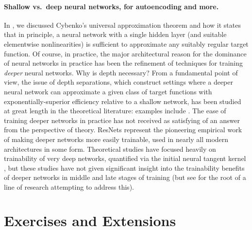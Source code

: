 \documentclass[../../book-main.tex]{subfiles}
\begin{document}
\paragraph{Shallow vs.\ deep neural networks, for autoencoding and more.}
In , we discussed Cybenko's universal approximation
theorem and how it states that in principle, a neural network with a single
hidden layer (and suitable elementwise nonlinearities) is sufficient to
approximate any suitably regular target function. Of course, in practice, the
major architectural reason for the dominance of neural networks in practice has
been the refinement of techniques for training \textit{deeper} neural networks.
Why is depth necessary?
From a fundamental point of view, the issue of depth separations, which
construct settings where a deeper neural network can approximate a given class
of target functions with exponentially-superior efficiency relative to a shallow
network,
has been studied at great length in the theoretical literature:
examples include \cite{Telgarsky2016-sn,Bresler2020-xy,Venturi2021-qc}. 
The ease of training deeper
networks in practice has not received as satisfying of an answer from the
perspective of theory. 
ResNets \cite{he2016deep} represent the pioneering empirical work of
making deeper networks more easily trainable, used in nearly all modern
architectures in some form. Theoretical studies have focused heavily on
trainability of very deep networks, quantified via the initial neural tangent
kernel \cite{Buchanan2021-sj,Martens2021-cx}, but these studies have not given
significant insight into the trainability benefits of deeper networks in middle
and late stages of training (but see \cite{Yang2021-gw} for the root of a line
of research attempting to address this).

\section{Exercises and Extensions}
\end{document}
